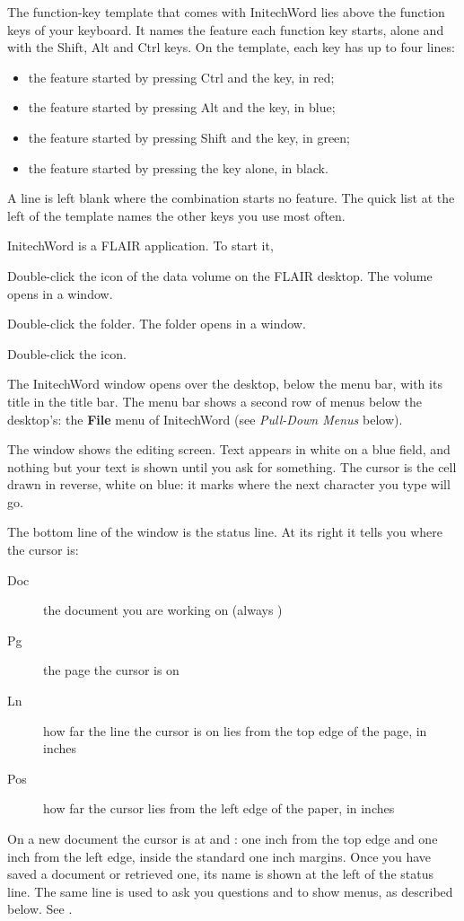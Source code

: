 The function-key template that comes with InitechWord lies above the
function keys of your keyboard.  It names the feature each function key
starts, alone and with the Shift, Alt and Ctrl keys.  On the template, each
key has up to four lines:
\begin{itemize}
\item the feature started by pressing Ctrl and the key, in red;
\item the feature started by pressing Alt and the key, in blue;
\item the feature started by pressing Shift and the key, in green;
\item the feature started by pressing the key alone, in black.
\end{itemize}
A line is left blank where the combination starts no feature.  The quick
list at the left of the template names the other keys you use most often.

InitechWord is a FLAIR application.  To start it,
\begin{WPSteps}
\item Double-click the icon of the data volume on the FLAIR desktop.  The
volume opens in a window.
\item Double-click the  folder.  The folder opens in a window.
\item Double-click the  icon.
\end{WPSteps}
The InitechWord window opens over the desktop, below the menu bar, with
its title  in the title bar.  The menu bar shows a second
row of menus below the desktop's: the \textbf{File} menu of InitechWord
(see \textit{Pull-Down Menus} below).


The window shows the editing screen.  Text appears in white on a blue
field, and nothing but your text is shown until you ask for something.  The
cursor is the cell drawn in reverse, white on blue: it marks where the next
character you type will go.

The bottom line of the window is the status line.  At its right it tells
you where the cursor is:
\begin{description}
\item[Doc] the document you are working on (always )
\item[Pg] the page the cursor is on
\item[Ln] how far the line the cursor is on lies from the top edge of the
page, in inches
\item[Pos] how far the cursor lies from the left edge of the paper, in inches
\end{description}
On a new document the cursor is at  and : one inch
from the top edge and one inch from the left edge, inside the standard one
inch margins.  Once you have saved a document or retrieved one, its name is
shown at the left of the status line.  The same line is used to ask you
questions and to show menus, as described below.  See .

